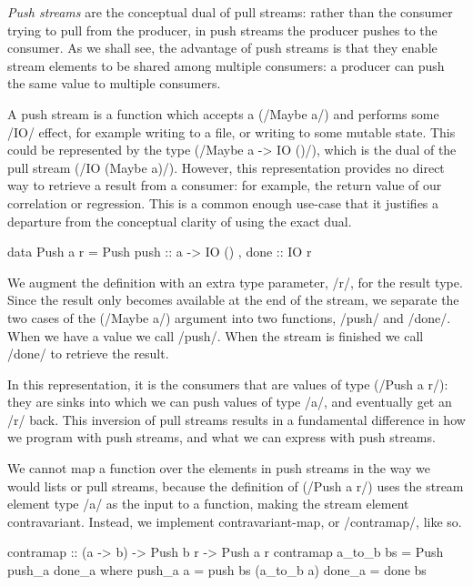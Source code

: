\emph{Push streams} are the conceptual dual of pull streams: rather than the consumer trying to pull from the producer, in push streams the producer pushes to the consumer.
As we shall see, the advantage of push streams is that they enable stream elements to be shared among multiple consumers: a producer can push the same value to multiple consumers.

A push stream is a function which accepts a (\Hs/Maybe a/) and performs some \Hs/IO/ effect, for example writing to a file, or writing to some mutable state.
This could be represented by the type (\Hs/Maybe a -> IO ()/), which is the dual of the pull stream (\Hs/IO (Maybe a)/).
However, this representation provides no direct way to retrieve a result from a consumer: for example, the return value of our correlation or regression.
This is a common enough use-case that it justifies a departure from the conceptual clarity of using the exact dual.

\begin{haskell}
data Push a r = Push
  { push :: a -> IO ()
  , done :: IO r }
\end{haskell}

We augment the definition with an extra type parameter, \Hs/r/, for the result type.
Since the result only becomes available at the end of the stream, we separate the two cases of the (\Hs/Maybe a/) argument into two functions, \Hs/push/ and \Hs/done/.
When we have a value we call \Hs/push/.
When the stream is finished we call \Hs/done/ to retrieve the result.


In this representation, it is the consumers that are values of type (\Hs/Push a r/): they are sinks into which we can push values of type \Hs/a/, and eventually get an \Hs/r/ back.
This inversion of pull streams results in a fundamental difference in how we program with push streams, and what we can express with push streams.

We cannot map a function over the elements in push streams in the way we would lists or pull streams, because the definition of (\Hs/Push a r/) uses the stream element type \Hs/a/ as the input to a function, making the stream element contravariant.
Instead, we implement contravariant-map, or \Hs/contramap/, like so.

\begin{haskell}
contramap :: (a -> b) -> Push b r -> Push a r
contramap a_to_b bs = Push push_a done_a
 where
  push_a a = push bs (a_to_b a)
  done_a   = done bs
\end{haskell}

